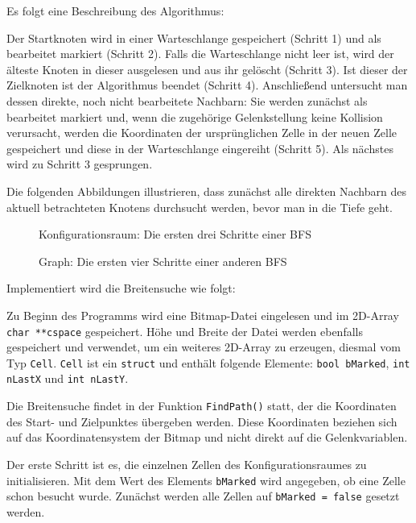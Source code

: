 \documentclass[11pt, a4paper]{article}
\newcommand{\code}{\texttt}
\begin{document}
Es folgt eine Beschreibung des Algorithmus:

Der Startknoten wird in einer Warteschlange gespeichert (Schritt 1) und als bearbeitet markiert (Schritt 2). Falls die Warteschlange nicht leer ist, wird der älteste Knoten in dieser ausgelesen und aus ihr gelöscht (Schritt 3). Ist dieser der Zielknoten ist der Algorithmus beendet (Schritt 4). Anschließend untersucht man dessen direkte, noch nicht bearbeitete Nachbarn: Sie werden zunächst als bearbeitet markiert und, wenn die zugehörige Gelenkstellung keine Kollision verursacht, werden die Koordinaten der ursprünglichen Zelle in der neuen Zelle gespeichert und diese in der Warteschlange eingereiht (Schritt 5). Als nächstes wird zu Schritt 3 gesprungen.

Die folgenden Abbildungen illustrieren, dass zunächst alle direkten Nachbarn des aktuell betrachteten Knotens durchsucht werden, bevor man in die Tiefe geht.

\begin{figure}[H]
	\caption{Konfigurationsraum: Die ersten drei Schritte einer BFS}
\end{figure}

\begin{figure}[H]
	\caption{Graph: Die ersten vier Schritte einer anderen BFS}
\end{figure}

Implementiert wird die Breitensuche wie folgt:

Zu Beginn des Programms wird eine Bitmap-Datei eingelesen und im 2D-Array \code{char **cspace} gespeichert. Höhe und Breite der Datei werden ebenfalls gespeichert und verwendet, um ein weiteres 2D-Array zu erzeugen, diesmal vom Typ \code{Cell}. \code{Cell} ist ein \code{struct} und enthält folgende Elemente: \code{bool bMarked}, \code{int  nLastX} und \code{int  nLastY}.

Die Breitensuche findet in der Funktion \code{FindPath()} statt, der die Koordinaten des Start- und Zielpunktes übergeben werden. Diese Koordinaten beziehen sich auf das Koordinatensystem der Bitmap und nicht direkt auf die Gelenkvariablen.

Der erste Schritt  ist es, die einzelnen Zellen des Konfigurationsraumes zu initialisieren. Mit dem Wert des Elements \code{bMarked} wird angegeben, ob eine Zelle schon besucht wurde. Zunächst werden alle Zellen auf \code{bMarked = false} gesetzt werden.
\end{document}
